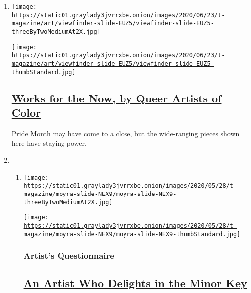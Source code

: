 \begin{enumerate}
\def\labelenumi{\arabic{enumi}.}
\item
  \texttt{[image: https://static01.graylady3jvrrxbe.onion/images/2020/06/23/t-magazine/art/viewfinder-slide-EUZ5/viewfinder-slide-EUZ5-threeByTwoMediumAt2X.jpg]}

  \href{/2020/06/29/t-magazine/queer-bipoc-artists.html}{\texttt{[image: https://static01.graylady3jvrrxbe.onion/images/2020/06/23/t-magazine/art/viewfinder-slide-EUZ5/viewfinder-slide-EUZ5-thumbStandard.jpg]}}

  \hypertarget{works-for-the-now-by-queer-artists-of-color}{%
  \subsection{\texorpdfstring{\href{/2020/06/29/t-magazine/queer-bipoc-artists.html}{Works
  for the Now, by Queer Artists of
  Color}}{Works for the Now, by Queer Artists of Color}}\label{works-for-the-now-by-queer-artists-of-color}}

  Pride Month may have come to a close, but the wide-ranging pieces
  shown here have staying power.
\item
  \begin{enumerate}
  \def\labelenumii{\arabic{enumii}.}
  \item
    \texttt{[image: https://static01.graylady3jvrrxbe.onion/images/2020/05/28/t-magazine/moyra-slide-NEX9/moyra-slide-NEX9-threeByTwoMediumAt2X.jpg]}

    \href{/2020/05/29/t-magazine/moyra-davey.html}{\texttt{[image: https://static01.graylady3jvrrxbe.onion/images/2020/05/28/t-magazine/moyra-slide-NEX9/moyra-slide-NEX9-thumbStandard.jpg]}}

    \hypertarget{artists-questionnaire}{%
    \subsubsection{Artist's Questionnaire}\label{artists-questionnaire}}

    \hypertarget{an-artist-who-delights-in-the-minor-key}{%
    \subsection{\texorpdfstring{\href{/2020/05/29/t-magazine/moyra-davey.html}{An
    Artist Who Delights in the Minor
    Key}}{An Artist Who Delights in the Minor Key}}\label{an-artist-who-delights-in-the-minor-key}}


\end{enumerate}
\end{enumerate}
